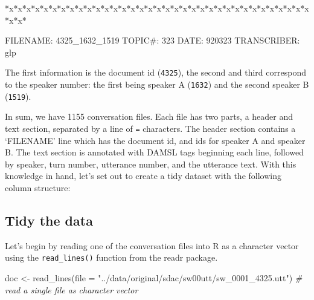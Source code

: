 \documentclass[
  letterpaper,
  DIV=11,
  numbers=noendperiod]{scrreport}
\newenvironment{Shaded}{\begin{snugshade}}{\end{snugshade}}
\newcommand{\AttributeTok}[1]{\textcolor[rgb]{0.00,0.00,0.00}{#1}}
\newcommand{\CommentTok}[1]{\textcolor[rgb]{0.00,0.00,0.00}{\textit{#1}}}
\newcommand{\FunctionTok}[1]{\textcolor[rgb]{0.00,0.00,0.00}{#1}}
\newcommand{\NormalTok}[1]{\textcolor[rgb]{0.00,0.00,0.00}{#1}}
\newcommand{\OtherTok}[1]{\textcolor[rgb]{0.00,0.00,0.00}{#1}}
\newcommand{\StringTok}[1]{\textcolor[rgb]{0.00,0.00,0.00}{#1}}
\theoremstyle{definition}
\theoremstyle{remark}
\begin{document}
\begin{Shaded}
\begin{Highlighting}[]
\NormalTok{*x*x*x*x*x*x*x*x*x*x*x*x*x*x*x*x*x*x*x*x*x*x*x*x*x*x*x*x*x*x*x*x*x*x*x*x*x*}


\NormalTok{FILENAME:   4325\_1632\_1519}
\NormalTok{TOPIC\#:     323}
\NormalTok{DATE:       920323}
\NormalTok{TRANSCRIBER:    glp}
\end{Highlighting}
\end{Shaded}

The first information is the document id (\texttt{4325}), the second and
third correspond to the speaker number: the first being speaker A
(\texttt{1632}) and the second speaker B (\texttt{1519}).

In sum, we have 1155 conversation files. Each file has two parts, a
header and text section, separated by a line of \texttt{=} characters.
The header section contains a `FILENAME' line which has the document id,
and ids for speaker A and speaker B. The text section is annotated with
DAMSL tags beginning each line, followed by speaker, turn number,
utterance number, and the utterance text. With this knowledge in hand,
let's set out to create a tidy dataset with the following column
structure:

\begin{table}

\end{table}

\hypertarget{tidy-the-data-1}{%
\subsection{Tidy the data}\label{tidy-the-data-1}}

Let's begin by reading one of the conversation files into R as a
character vector using the \texttt{read\_lines()} function from the
readr package.

\begin{Shaded}
\begin{Highlighting}[]
\NormalTok{doc }\OtherTok{\textless{}{-}} 
  \FunctionTok{read\_lines}\NormalTok{(}\AttributeTok{file =} \StringTok{"../data/original/sdac/sw00utt/sw\_0001\_4325.utt"}\NormalTok{) }\CommentTok{\# read a single file as character vector}
\end{Highlighting}
\end{Shaded}
\end{document}
